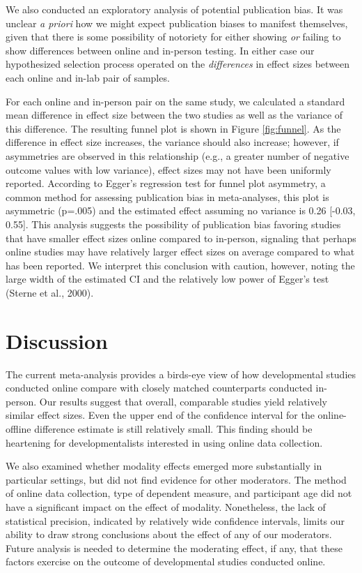 \documentclass[
  man,floatsintext]{apa6}
\begin{document}
We also conducted an exploratory analysis of potential publication bias. It was unclear \emph{a priori} how we might expect publication biases to manifest themselves, given that there is some possibility of notoriety for either showing \emph{or} failing to show differences between online and in-person testing. In either case our hypothesized selection process operated on the \emph{differences} in effect sizes between each online and in-lab pair of samples.

For each online and in-person pair on the same study, we calculated a standard mean difference in effect size between the two studies as well as the variance of this difference. The resulting funnel plot is shown in Figure \ref{fig:funnel}. As the difference in effect size increases, the variance should also increase; however, if asymmetries are observed in this relationship (e.g., a greater number of negative outcome values with low variance), effect sizes may not have been uniformly reported. According to Egger's regression test for funnel plot asymmetry, a common method for assessing publication bias in meta-analyses, this plot is asymmetric (p=.005) and the estimated effect assuming no variance is 0.26 {[}-0.03, 0.55{]}. This analysis suggests the possibility of publication bias favoring studies that have smaller effect sizes online compared to in-person, signaling that perhaps online studies may have relatively larger effect sizes on average compared to what has been reported. We interpret this conclusion with caution, however, noting the large width of the estimated CI and the relatively low power of Egger's test (Sterne et al., 2000).

\hypertarget{discussion}{%
\section{Discussion}\label{discussion}}

The current meta-analysis provides a birds-eye view of how developmental studies conducted online compare with closely matched counterparts conducted in-person. Our results suggest that overall, comparable studies yield relatively similar effect sizes. Even the upper end of the confidence interval for the online-offline difference estimate is still relatively small. This finding should be heartening for developmentalists interested in using online data collection.

We also examined whether modality effects emerged more substantially in particular settings, but did not find evidence for other moderators. The method of online data collection, type of dependent measure, and participant age did not have a significant impact on the effect of modality. Nonetheless, the lack of statistical precision, indicated by relatively wide confidence intervals, limits our ability to draw strong conclusions about the effect of any of our moderators. Future analysis is needed to determine the moderating effect, if any, that these factors exercise on the outcome of developmental studies conducted online.
\end{document}
